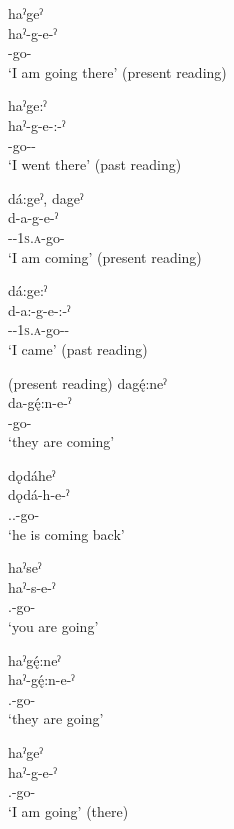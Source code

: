 \ea\label{ex:simplemotex9} 
\ea haˀgeˀ\\
\gll haˀ-g-e-ˀ\\
{\translocativefactual}-go-{\punctual}\\
\glt ‘I am going there’ (present reading)

\ex haˀge:ˀ\\
\gll haˀ-g-e-:-ˀ\\
{\translocativefactual}-go-{\purposive}-{\punctual}\\
\glt ‘I went there’ (past reading)
\z
\z

\ea\label{ex:simplemotex10}
\ea dá:geˀ, dageˀ\\
\gll d-a-g-e-ˀ\\
{\cislocative}-{\factual}-\textsc{1s.a}-go-{\punctual}\footnotemark\\
\glt ‘I am coming’ (present reading)

\ex dá:ge:ˀ\\
\gll d-a:-g-e-:-ˀ\\
{\cislocative}-{\factual}-\textsc{1s.a}-go-{\purposive}-{\punctual}\\
\glt ‘I came’ (past reading)\\
\z
\z

\ea\label{ex:simplemotex11}  (present reading)
\ea dagę́:neˀ\\
\gll da-gę́:n-e-ˀ\\
 -go-{\punctual}\\
\glt `they are coming'

\ex dǫdáheˀ\\
\gll dǫdá-h-e-ˀ\\
 {\dualic.\factual.\cislocative}-go-{\punctual}\\
\glt `he is coming back'

\ex haˀseˀ\\
\gll haˀ-s-e-ˀ\\
 {\translocative.\factual}-go-{\punctual}\\
\glt `you are going'

\ex haˀgę́:neˀ\\
\gll haˀ-gę́:n-e-ˀ\\
 {\translocative.\factual}-go-{\punctual}\\
\glt `they are going'

\ex haˀgeˀ\\
\gll haˀ-g-e-ˀ\\
{\translocative.\factual}-go-{\punctual}\\
\glt ‘I am going’ (there)\\

